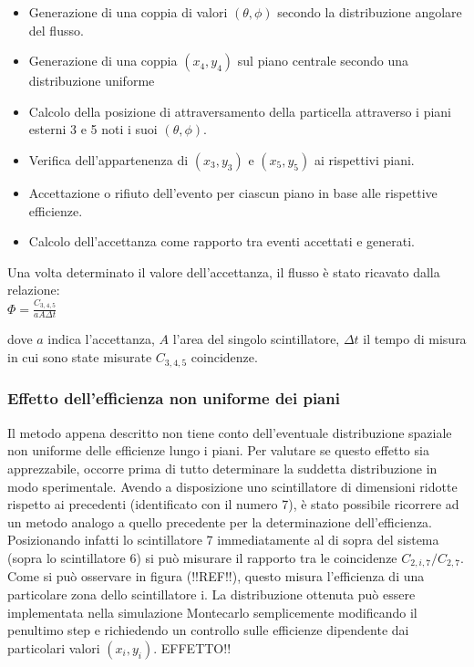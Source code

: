 \documentclass[11pt]{article}
\begin{document}
\begin{itemize}
\item{Generazione di una coppia di valori $(\theta,\phi)$ secondo la distribuzione angolare del flusso.}\\
\item{Generazione di una coppia $(x_{4},y_{4})$ sul piano centrale secondo una distribuzione uniforme}\\
\item{Calcolo della posizione di attraversamento della particella attraverso i piani esterni 3 e 5 noti i suoi $(\theta,\phi)$.}
\item{Verifica dell'appartenenza di $(x_{3},y_{3})$ e $(x_{5},y_{5})$ ai rispettivi piani.}
\item{Accettazione o rifiuto dell'evento per ciascun piano in base alle rispettive efficienze.}
\item{Calcolo dell'accettanza come rapporto tra eventi accettati e generati.}
\end{itemize}

Una volta determinato il valore dell'accettanza, il flusso è stato ricavato dalla relazione: \\
$
\Phi = \frac{C_{3,4,5}}{a A \Delta t}
$

dove $a$ indica l'accettanza, $A$ l'area del singolo scintillatore, $\Delta t$ il tempo di misura in cui sono state misurate $C_{3,4,5}$ coincidenze.

\subsubsection{Effetto dell'efficienza non uniforme dei piani}
Il metodo appena descritto non tiene conto dell'eventuale distribuzione spaziale non uniforme delle efficienze lungo i piani. Per valutare se questo effetto sia apprezzabile, occorre prima di tutto determinare la suddetta distribuzione in modo sperimentale. Avendo a disposizione uno scintillatore di dimensioni ridotte rispetto ai precedenti (identificato con il numero 7), è stato possibile ricorrere ad un metodo analogo a quello precedente per la determinazione dell'efficienza. Posizionando infatti lo scintillatore 7 immediatamente al di sopra del sistema (sopra lo scintillatore 6) si può misurare il rapporto tra le coincidenze $C_{2,i,7}/C_{2,7}$. Come si può osservare in figura (!!REF!!), questo misura l'efficienza di una particolare zona dello scintillatore i. La distribuzione ottenuta può essere implementata nella simulazione Montecarlo semplicemente modificando il penultimo step e richiedendo un controllo sulle efficienze dipendente dai particolari valori $(x_i,y_i)$. EFFETTO!!
\end{document}
